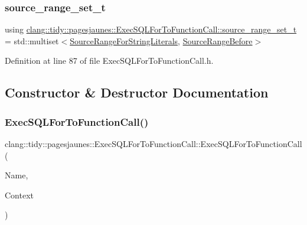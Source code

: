 \subsubsection{\texorpdfstring{source\+\_\+range\+\_\+set\+\_\+t}{source\_range\_set\_t}}
{\footnotesize\ttfamily using \hyperlink{classclang_1_1tidy_1_1pagesjaunes_1_1_exec_s_q_l_for_to_function_call_a9ae5c1a41755645dea6218b2cad564ac}{clang\+::tidy\+::pagesjaunes\+::\+Exec\+S\+Q\+L\+For\+To\+Function\+Call\+::source\+\_\+range\+\_\+set\+\_\+t} =  std\+::multiset$<$\hyperlink{classclang_1_1tidy_1_1pagesjaunes_1_1_exec_s_q_l_for_to_function_call_1_1_source_range_for_string_literals}{Source\+Range\+For\+String\+Literals}, \hyperlink{classclang_1_1tidy_1_1pagesjaunes_1_1_exec_s_q_l_for_to_function_call_1_1_source_range_before}{Source\+Range\+Before}$>$}



Definition at line 87 of file Exec\+S\+Q\+L\+For\+To\+Function\+Call.\+h.



\subsection{Constructor \& Destructor Documentation}
\mbox{\label{classclang_1_1tidy_1_1pagesjaunes_1_1_exec_s_q_l_for_to_function_call_a926ca8825605877d043f9bbaf3e0e5d8}} 
\subsubsection{\texorpdfstring{Exec\+S\+Q\+L\+For\+To\+Function\+Call()}{ExecSQLForToFunctionCall()}}
{\footnotesize\ttfamily clang\+::tidy\+::pagesjaunes\+::\+Exec\+S\+Q\+L\+For\+To\+Function\+Call\+::\+Exec\+S\+Q\+L\+For\+To\+Function\+Call (\begin{DoxyParamCaption}\item[{String\+Ref}]{Name,  }\item[{Clang\+Tidy\+Context $\ast$}]{Context }\end{DoxyParamCaption})}




